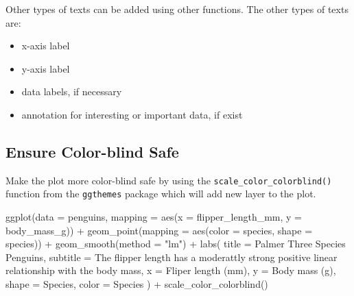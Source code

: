 \documentclass[
  letterpaper,
  DIV=11,
  numbers=noendperiod]{scrreprt}
\newenvironment{Shaded}{\begin{snugshade}}{\end{snugshade}}
\newcommand{\AttributeTok}[1]{\textcolor[rgb]{0.40,0.45,0.13}{#1}}
\newcommand{\FunctionTok}[1]{\textcolor[rgb]{0.28,0.35,0.67}{#1}}
\newcommand{\NormalTok}[1]{\textcolor[rgb]{0.00,0.23,0.31}{#1}}
\newcommand{\SpecialCharTok}[1]{\textcolor[rgb]{0.37,0.37,0.37}{#1}}
\newcommand{\StringTok}[1]{\textcolor[rgb]{0.13,0.47,0.30}{#1}}
\providecommand{\tightlist}{%
  \setlength{\itemsep}{0pt}\setlength{\parskip}{0pt}}\usepackage{longtable,booktabs,array}
\begin{document}
Other types of texts can be added using other functions. The other types
of texts are:

\begin{itemize}
\tightlist
\item
  x-axis label
\item
  y-axis label
\item
  data labels, if necessary
\item
  annotation for interesting or important data, if exist
\end{itemize}

\subsection{Ensure Color-blind Safe}\label{ensure-color-blind-safe}

Make the plot more color-blind safe by using the
\texttt{scale\_color\_colorblind()} function from the \texttt{ggthemes}
package which will add new layer to the plot.

\begin{Shaded}
\begin{Highlighting}[]
\FunctionTok{ggplot}\NormalTok{(}\AttributeTok{data =}\NormalTok{ penguins,}
       \AttributeTok{mapping =} \FunctionTok{aes}\NormalTok{(}\AttributeTok{x =}\NormalTok{ flipper\_length\_mm, }\AttributeTok{y =}\NormalTok{ body\_mass\_g)) }\SpecialCharTok{+}
  \FunctionTok{geom\_point}\NormalTok{(}\AttributeTok{mapping =} \FunctionTok{aes}\NormalTok{(}\AttributeTok{color =}\NormalTok{ species, }\AttributeTok{shape =}\NormalTok{ species)) }\SpecialCharTok{+}
  \FunctionTok{geom\_smooth}\NormalTok{(}\AttributeTok{method =} \StringTok{"lm"}\NormalTok{) }\SpecialCharTok{+}
  \FunctionTok{labs}\NormalTok{(}
    \AttributeTok{title =} \StringTok{\textquotesingle{}Palmer Three Species Penguins\textquotesingle{}}\NormalTok{,}
    \AttributeTok{subtitle =} \StringTok{\textquotesingle{}The flipper length has a moderattly strong positive linear relationship with the body mass\textquotesingle{}}\NormalTok{,}
    \AttributeTok{x =} \StringTok{\textquotesingle{}Fliper length (mm)\textquotesingle{}}\NormalTok{,}
    \AttributeTok{y =} \StringTok{\textquotesingle{}Body mass (g)\textquotesingle{}}\NormalTok{,}
    \AttributeTok{shape =} \StringTok{\textquotesingle{}Species\textquotesingle{}}\NormalTok{,}
    \AttributeTok{color =} \StringTok{\textquotesingle{}Species\textquotesingle{}}
\NormalTok{  ) }\SpecialCharTok{+}
  \FunctionTok{scale\_color\_colorblind}\NormalTok{()}
\end{Highlighting}
\end{Shaded}
\end{document}
